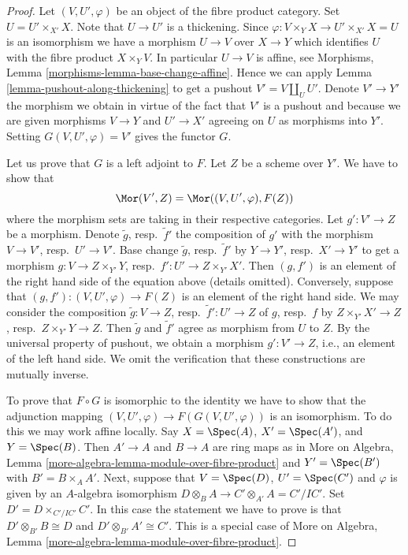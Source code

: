 \begin{proof}
Let $(V, U', \varphi)$ be an object of the fibre product category.
Set $U = U' \times_{X'} X$. Note that $U \to U'$ is a thickening.
Since $\varphi : V \times_Y X \to U' \times_{X'} X = U$ is an isomorphism
we have a morphism $U \to V$ over $X \to Y$ which identifies $U$ with
the fibre product $X \times_Y V$. In particular $U \to V$ is affine, see
Morphisms, Lemma \ref{morphisms-lemma-base-change-affine}.
Hence we can apply Lemma \ref{lemma-pushout-along-thickening}
to get a pushout $V' = V \amalg_U U'$. Denote $V' \to Y'$ the morphism
we obtain in virtue of the fact that $V'$ is a pushout and because
we are given morphisms $V \to Y$ and $U' \to X'$ agreeing on $U$
as morphisms into $Y'$. Setting $G(V, U', \varphi) = V'$
gives the functor $G$.

\medskip\noindent
Let us prove that $G$ is a left adjoint to $F$. Let $Z$ be a scheme
over $Y'$. We have to show that
$$
\Mor(V', Z) = \Mor((V, U', \varphi), F(Z))
$$
where the morphism sets are taking in their respective categories.
Let $g' : V' \to Z$ be a morphism. Denote $\tilde g$, resp.\ $\tilde f'$
the composition of $g'$ with the morphism $V \to V'$, resp.\ $U' \to V'$.
Base change $\tilde g$, resp.\ $\tilde f'$ by $Y \to Y'$, resp.\ $X' \to Y'$
to get a morphism $g : V \to Z \times_{Y'} Y$,
resp.\ $f' : U' \to Z \times_{Y'} X'$. Then $(g, f')$ is an element
of the right hand side of the equation above (details omitted).
Conversely, suppose that $(g, f') : (V, U', \varphi) \to F(Z)$ is an
element of the right hand side.
We may consider the composition $\tilde g : V \to Z$,
resp.\ $\tilde f' : U' \to Z$ of $g$, resp.\ $f$ by
$Z \times_{Y'} X' \to Z$, resp.\ $Z \times_{Y'} Y \to Z$.
Then $\tilde g$ and $\tilde f'$ agree as morphism from $U$ to $Z$.
By the universal property of pushout, we obtain a morphism
$g' : V' \to Z$, i.e., an element of the left hand side.
We omit the verification that these constructions are mutually inverse.

\medskip\noindent
To prove that $F \circ G$ is isomorphic to the identity we have to
show that the adjunction mapping
$(V, U', \varphi) \to F(G(V, U', \varphi))$ is an isomorphism.
To do this we may work affine locally. Say $X = \Spec(A)$, $X' = \Spec(A')$,
and $Y = \Spec(B)$. Then $A' \to A$ and $B \to A$ are ring maps as in
More on Algebra, Lemma \ref{more-algebra-lemma-module-over-fibre-product}
and $Y' = \Spec(B')$ with $B' = B \times_A A'$. Next, suppose that
$V = \Spec(D)$, $U' = \Spec(C')$ and $\varphi$ is given by an
$A$-algebra isomorphism $D \otimes_B A \to C' \otimes_{A'} A = C'/IC'$.
Set $D' = D \times_{C'/IC'} C'$. In this case the statement we have to
prove is that $D' \otimes_{B'} B \cong D$ and $D' \otimes_{B'} A' \cong C'$.
This is a special case of More on Algebra, Lemma
\ref{more-algebra-lemma-module-over-fibre-product}.
\end{proof}

